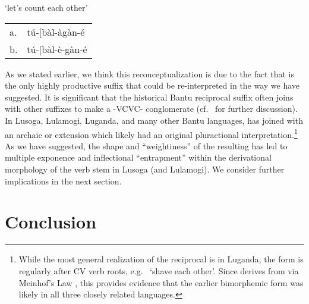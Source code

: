 \documentclass[output=paper,
modfonts
]{LSP/langsci}
\begin{document}
\ea `let's count each other'\\
\begin{tabular}[t]{@{}ll}
a. & tú-{[}bàl-àgàn-é \\
b. & tú-{[}bàl-è-gàn-é \\
\end{tabular}
\z

\noindent As we stated earlier, we think this reconceptualization is due to the
fact that  is the only highly productive suffix that could
be re-interpreted in the way we have suggested. It is significant that
the historical Bantu reciprocal suffix  often joins with
other suffixes to make a -VCVC- conglomerate (cf.\ \citealt[1289--91]{bostoen2010} for further discussion). In Lusoga, Lulamogi, Luganda, and
many other Bantu languages,  has joined with an archaic
 or  extension which likely had an original
pluractional interpretation.\footnote{While the most general realization
  of the reciprocal is  in Luganda, the form is regularly
   after CV verb roots, e.g.\  `shave each
  other'. Since  derives from  via
  Meinhof's Law \citep[192--193]{katamba1991}, this provides evidence
  that the earlier bimorphemic form was likely  in all
  three closely related languages.} As we have suggested, the shape and
``weightiness'' of the resulting  has led to multiple
exponence and inflectional ``entrapment'' within the derivational
morphology of the verb stem in Lusoga (and Lulamogi). We consider
further implications in the next section.

\section{Conclusion}
\end{document}
